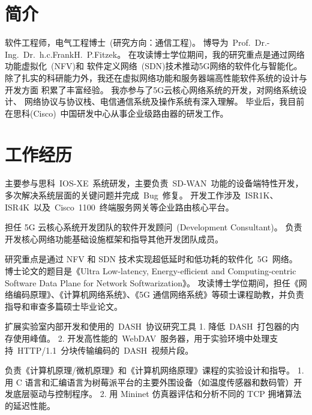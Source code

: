 \documentclass[11pt,a4paper]{moderncv}
\begin{document}
\maketitle
\vspace*{-10mm}

\section{简介}

软件工程师，电气工程博士~(研究方向：通信工程)。
博导为~Prof.~Dr.-Ing.~Dr.~h.c.FrankH.~P.Fitzek。
在攻读博士学位期间，我的研究重点是通过网络功能虚拟化~(NFV)和 软件定义网络~(SDN)技术推动5G网络的软件化与智能化。
除了扎实的科研能力外，我还在虚拟网络功能和服务器端高性能软件系统的设计与开发方面 积累了丰富经验。
我亦参与了5G云核心网络系统的开发，对网络系统设计、 网络协议与协议栈、电信通信系统及操作系统有深入理解。
毕业后，我目前在思科(Cisco)~中国研发中心从事企业级路由器的研发工作。

\section{工作经历}

{
主要参与思科~IOS-XE~系统研发，主要负责~SD-WAN~功能的设备端特性开发，多次解决系统层面的关键问题并完成~Bug~修复。
开发工作涉及~ISR1K、ISR4K~以及~Cisco~1100~终端服务网关等企业路由核心平台。
}

{
担任 5G 云核心系统开发团队的软件开发顾问~(Development Consultant)。
负责开发核心网络功能基础设施框架和指导其他开发团队成员。
}

{
研究重点是通过 NFV 和 SDN 技术实现超低延时和低功耗的软件化~5G~网络。
博士论文的题目是《Ultra Low-latency, Energy-efficient and Computing-centric Software Data Plane for Network Softwarization》。
攻读博士学位期间，担任《网络编码原理》、《计算机网络系统》、《5G 通信网络系统》等硕士课程助教，并负责指导和审查多篇硕士毕业论文。
}

{
扩展实验室内部开发和使用的~DASH~协议研究工具
1. 降低~DASH~打包器的内存使用峰值。
2. 开发高性能的~WebDAV~服务器，用于实验环境中处理支持~HTTP/1.1~分块传输编码的~DASH~视频片段。
}

{
负责《计算机原理/微机原理》和《计算机网络原理》课程的实验设计和指导。
1. 用 C 语言和汇编语言为树莓派平台的主要外围设备（如温度传感器和数码管）开发底层驱动与控制程序。
2. 用 Mininet 仿真器评估和分析不同的 TCP 拥堵算法的延迟性能。
}
\end{document}
